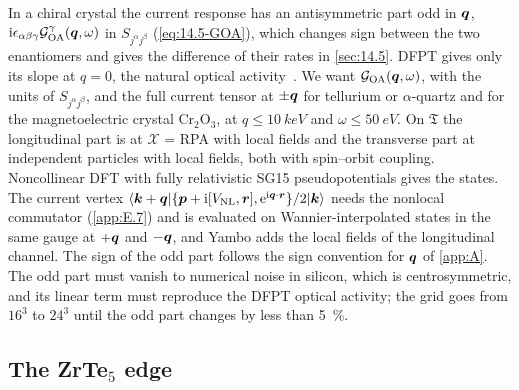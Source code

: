 In a chiral crystal the current response has an antisymmetric part odd in $\bm{q}$, $\mathrm{i}\epsilon_{\alpha\beta\gamma}\mathcal{G}^\gamma_{\mathrm{OA}}(\bm{q},\omega)$ in $S_{j^\alpha j^\beta}$ (\cref{eq:14.5-GOA}), which changes sign between the two enantiomers and gives the difference of their rates in \cref{sec:14.5}. DFPT gives only its slope at $q = 0$, the natural optical activity~\cite{zabalo2023natural}. We want $\mathcal{G}_{\mathrm{OA}}(\bm{q},\omega)$, with the units of $S_{j^\alpha j^\beta}$, and the full current tensor at $\pm\bm{q}$ for tellurium or $\alpha$-quartz and for the magnetoelectric crystal Cr$_2$O$_3$, at $q \le \SI{10}{keV}$ and $\omega \le \SI{50}{eV}$. On $\mathfrak{T}$ the longitudinal part is at $\mathcal{X}$ = RPA with local fields and the transverse part at independent particles with local fields, both with spin--orbit coupling. Noncollinear DFT with fully relativistic SG15 pseudopotentials gives the states. The current vertex $\langle\bm{k}+\bm{q}|\{\bm{p} + \mathrm{i}[V_{\mathrm{NL}},\bm{r}],\mathrm{e}^{\mathrm{i}\bm{q}\cdot\bm{r}}\}/2|\bm{k}\rangle$ needs the nonlocal commutator (\cref{app:E.7}) and is evaluated on Wannier-interpolated states in the same gauge at $+\bm{q}$ and $-\bm{q}$, and Yambo adds the local fields of the longitudinal channel. The sign of the odd part follows the sign convention for $\bm{q}$ of \cref{app:A}. The odd part must vanish to numerical noise in silicon, which is centrosymmetric, and its linear term must reproduce the DFPT optical activity; the grid goes from $16^3$ to $24^3$ until the odd part changes by less than \SI{5}{\percent}.

\subsection{The ZrTe\texorpdfstring{$_5$}{5} edge}

